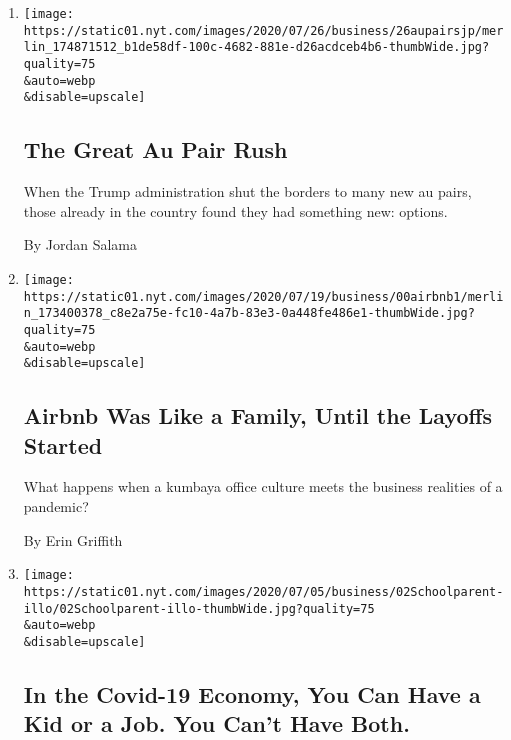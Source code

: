 \begin{enumerate}
\def\labelenumi{\arabic{enumi}.}
\item
  \href{/2020/07/25/business/the-great-au-pair-rush.html}{}

  \texttt{[image: https://static01.nyt.com/images/2020/07/26/business/26aupairsjp/merlin\_174871512\_b1de58df-100c-4682-881e-d26acdceb4b6-thumbWide.jpg?quality=75\\\&auto=webp\\\&disable=upscale]}

  \hypertarget{the-great-au-pair-rush}{%
  \subsection{The Great Au Pair Rush}\label{the-great-au-pair-rush}}

  When the Trump administration shut the borders to many new au pairs,
  those already in the country found they had something new: options.

  By Jordan Salama
\item
  \href{/2020/07/17/technology/airbnb-coronavirus-layoffs-.html}{}

  \texttt{[image: https://static01.nyt.com/images/2020/07/19/business/00airbnb1/merlin\_173400378\_c8e2a75e-fc10-4a7b-83e3-0a448fe486e1-thumbWide.jpg?quality=75\\\&auto=webp\\\&disable=upscale]}

  \hypertarget{airbnb-was-like-a-family-until-the-layoffs-started-1}{%
  \subsection{Airbnb Was Like a Family, Until the Layoffs
  Started}\label{airbnb-was-like-a-family-until-the-layoffs-started-1}}

  What happens when a kumbaya office culture meets the business
  realities of a pandemic?

  By Erin Griffith
\item
  \href{/2020/07/02/business/covid-economy-parents-kids-career-homeschooling.html}{}

  \texttt{[image: https://static01.nyt.com/images/2020/07/05/business/02Schoolparent-illo/02Schoolparent-illo-thumbWide.jpg?quality=75\\\&auto=webp\\\&disable=upscale]}

  \hypertarget{in-the-covid-19-economy-you-can-have-a-kid-or-a-job-you-cant-have-both}{%
  \subsection{In the Covid-19 Economy, You Can Have a Kid or a Job. You
  Can't Have
  Both.}\label{in-the-covid-19-economy-you-can-have-a-kid-or-a-job-you-cant-have-both}}


\end{enumerate}
